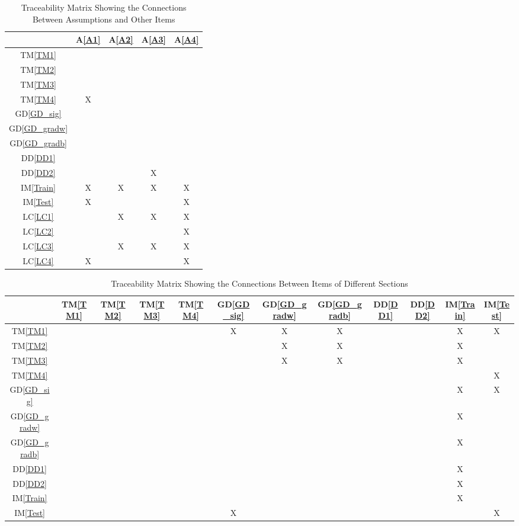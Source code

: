 \documentclass[12pt]{article}
\newcommand{\dref}[1]{GD\ref{#1}}
\newcommand{\ddref}[1]{DD\ref{#1}}
\newcommand{\tref}[1]{TM\ref{#1}}
\newcommand{\aref}[1]{A\ref{#1}}
\newcommand{\iref}[1]{IM\ref{#1}}
\newcommand{\lcref}[1]{LC\ref{#1}}
\begin{document}
\begin{table}[h!]
\centering
\begin{tabular}{|c|c|c|c|c|}
\hline
	& \aref{A1}& \aref{A2}& \aref{A3}& \aref{A4} \\
\hline
\tref{TM1}        & & & &  \\ \hline
\tref{TM2}        & & & &  \\ \hline
\tref{TM3}        & & & & \\ \hline
\tref{TM4}        &X& & & \\ \hline
\dref{GD_sig}        & & & &  \\ \hline
\dref{GD_gradw}        & & & & \\ \hline
\dref{GD_gradb}       & & & & \\ \hline
\ddref{DD1}       & & & &  \\ \hline
\ddref{DD2}       & & & X &  \\ \hline
\iref{Train}       & X & X & X & X \\ \hline
\iref{Test}        & X & & & X \\ \hline
\lcref{LC1}        & & X & X & X \\ \hline
\lcref{LC2}        & & & & X \\ \hline
\lcref{LC3}        & & X & X & X \\ \hline
\lcref{LC4}       & X & & & X \\
\hline
\end{tabular}
\caption{Traceability Matrix Showing the Connections Between Assumptions and Other Items}
\label{Table:A_trace}
\end{table}

\begin{table}[h!]
\centering
\begin{tabular}{|c|c|c|c|c|c|c|c|c|c|c|c|}
\hline        
	& \tref{TM1}& \tref{TM2}& \tref{TM3}& \tref{TM4}& \dref{GD_sig}& \dref{GD_gradw} & \dref{GD_gradb}& \ddref{DD1} & \ddref{DD2}& \iref{Train}& \iref{Test}\\
\hline
\tref{TM1}        & & & & &X&X&X& & &X&X\\ \hline
\tref{TM2}        & & & & & &X&X& & &X& \\ \hline
\tref{TM3}        & & & & & &X&X& & &X&  \\ \hline
\tref{TM4}        & & & & & & & & & & &X \\ \hline
\dref{GD_sig}     & & & & & & & & & &X&X \\ \hline
\dref{GD_gradw}   & & & & & & & & & &X&  \\ \hline
\dref{GD_gradb}   & & & & & & & & & &X&  \\ \hline
\ddref{DD1}       & & & & & & & & & &X&  \\ \hline
\ddref{DD2}       & & & & & & & & & &X&  \\ \hline
\iref{Train}      & & & & & & & & & &X&  \\ \hline
\iref{Test}       & & & & &X& & & & & &X \\ 
\hline
\end{tabular}
\caption{Traceability Matrix Showing the Connections Between Items of Different Sections}
\label{Table:trace}
\end{table}
\end{document}
